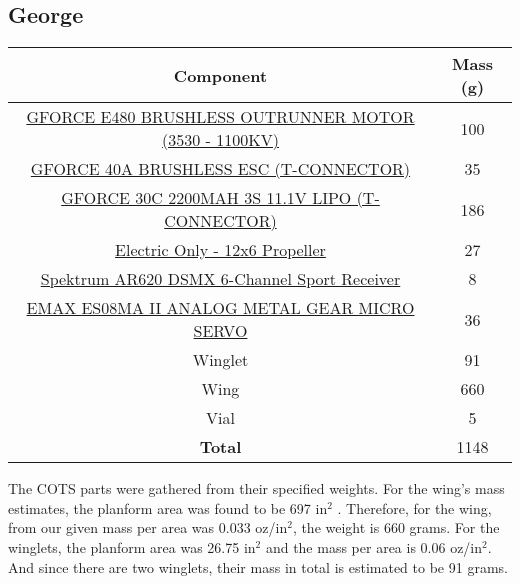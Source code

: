     \subsection{George}
     \begin{table}[H]
        \begin{tabular}{|c|c| } %
            \hline \textbf{Component} & \textbf{Mass (g)} \\ \hline %
            \href{https://www.amazon.com/Brushless-Outrunner-Multicopters-Helicopter-Control/dp/B08MKQFSVF/ref=asc_df_B08MKQFSVF/?tag=hyprod-20&linkCode=df0&hvadid=475795164185&hvpos=&hvnetw=g&hvrand=9902342740412303481&hvpone=&hvptwo=&hvqmt=&hvdev=c&hvdvcmdl=&hvlocint=&hvlocphy=2840&hvtargid=pla-1195392311214&th=1}{GFORCE E480 BRUSHLESS OUTRUNNER MOTOR (3530 - 1100KV)} & 100 \\ \hline
            \href{http://www.valuehobby.com/gforce-40a-esc.html}{GFORCE 40A BRUSHLESS ESC (T-CONNECTOR)} & 35 \\ \hline
            \href{http://www.valuehobby.com/30c-2200mah-3s-t.html}{GFORCE 30C 2200MAH 3S 11.1V LIPO (T-CONNECTOR)} & 186 \\ \hline
            \href{https://www.masterairscrew.com/products/electric-only-12x6-propeller?currency=USD&utm_medium=cpc&utm_source=google&utm_campaign=Google\%20Shopping&gclid=CjwKCAiA9aKQBhBREiwAyGP5laqPgb8z2BGon5sD8qHYRZQVab7IcA0DZg8DOcFMsDTccBgRqirzgBoC1wkQAvD_BwE}{Electric Only - 12x6 Propeller} & 27 \\ \hline
            \href{https://www.horizonhobby.com/product/ar620-dsmx-6-channel-sport-receiver/SPMAR620.html?gclid=CjwKCAiA9aKQBhBREiwAyGP5lX6-hyQKl87DI0WH0pgWG2HS0woZKcd-L2bMRS_qWmVI1fLqpeCX0BoCrRAQAvD_BwE}{Spektrum AR620 DSMX 6-Channel Sport Receiver} & 8 \\ \hline
            \href{https://arrishobby.com/emax-es08ma-ii-12g-mini-metal-gear-analog-servo-p0842.html?VariantsId=12700}{EMAX ES08MA II ANALOG METAL GEAR MICRO SERVO} & 36 \\ \hline
            Winglet  & 91  \\ \hline
            Wing & 660 \\ \hline
            Vial & 5 \\ \hline
            \textbf{Total} & 1148 \\ \hline
        \end{tabular}
        \end{table}
        
        The COTS parts were gathered from their specified weights. For the wing's mass estimates, the planform area was found to be 697 in$^2$ . Therefore, for the wing, from our given mass per area was 0.033 oz/in$^2$, the weight is 660 grams. For the winglets, the planform area was 26.75 in$^2$ and the mass per area is 0.06 oz/in$^2$. And since there are two winglets, their mass in total is estimated to be 91 grams.
        
